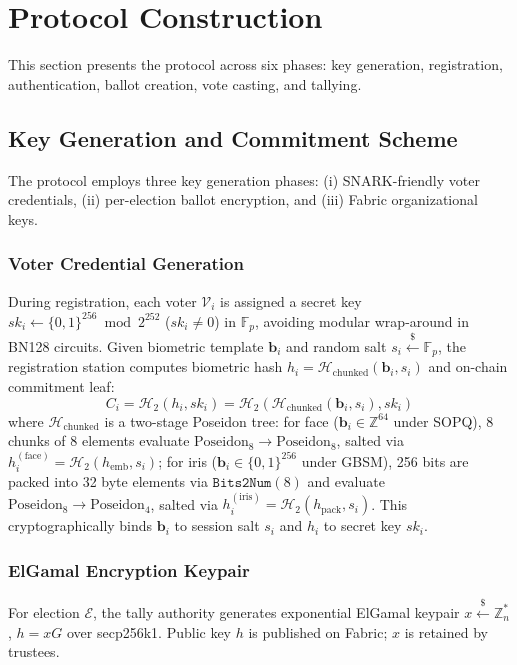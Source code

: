 \documentclass[10pt,letterpaper,journal]{IEEEtran}
\begin{document}

\section{Protocol Construction}
\label{sec:protocol_construction}

This section presents the protocol across six phases: key generation, registration, authentication, ballot creation, vote casting, and tallying.

\subsection{Key Generation and Commitment Scheme}
The protocol employs three key generation phases: (i) SNARK-friendly voter credentials, (ii) per-election ballot encryption, and (iii) Fabric organizational keys.

\subsubsection{Voter Credential Generation}
During registration, each voter $\mathcal{V}_i$ is assigned a secret key $sk_i \leftarrow \{0,1\}^{256} \bmod 2^{252}$ ($sk_i \neq 0$) in $\mathbb{F}_p$, avoiding modular wrap-around in BN128 circuits. Given biometric template $\mathbf{b}_i$ and random salt $s_i \xleftarrow{\$} \mathbb{F}_p$, the registration station computes biometric hash $h_i = \mathcal{H}_{\text{chunked}}(\mathbf{b}_i, s_i)$ and on-chain commitment leaf:
\begin{equation}
\label{eq:commitment-leaf}
C_i = \mathcal{H}_2(h_i, sk_i) = \mathcal{H}_2(\mathcal{H}_{\text{chunked}}(\mathbf{b}_i, s_i), sk_i)
\end{equation}
where $\mathcal{H}_{\text{chunked}}$ is a two-stage Poseidon tree: for face ($\mathbf{b}_i \in \mathbb{Z}^{64}$ under SOPQ), 8 chunks of 8 elements evaluate $\text{Poseidon}_8 \rightarrow \text{Poseidon}_8$, salted via $h_i^{(\text{face})} = \mathcal{H}_2(h_{\text{emb}}, s_i)$; for iris ($\mathbf{b}_i \in \{0,1\}^{256}$ under GBSM), 256 bits are packed into 32 byte elements via $\texttt{Bits2Num}(8)$ and evaluate $\text{Poseidon}_8 \rightarrow \text{Poseidon}_4$, salted via $h_i^{(\text{iris})} = \mathcal{H}_2(h_{\text{pack}}, s_i)$. This cryptographically binds $\mathbf{b}_i$ to session salt $s_i$ and $h_i$ to secret key $sk_i$.

\subsubsection{ElGamal Encryption Keypair}
For election $\mathcal{E}$, the tally authority generates exponential ElGamal keypair $x \xleftarrow{\$} \mathbb{Z}_n^*$, $h = xG$ over secp256k1. Public key $h$ is published on Fabric; $x$ is retained by trustees.
\end{document}
